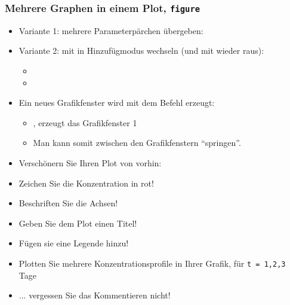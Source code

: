       \begin{frame}
          \frametitle{Mehrere Graphen in einem Plot, \texttt{figure}}
          \begin{itemize}
              \item Variante 1: mehrere Parameterpärchen übergeben: 
              \item Variante 2: mit  in Hinzufügmodus wechseln (und mit  wieder raus):
              \begin{itemize}
                  \item {}
                  \item {}
              \end{itemize}
              \item Ein neues Grafikfenster wird mit dem Befehl  erzeugt:
              \begin{itemize}
                  \item {}, erzeugt das Grafikfenster 1
                  \item Man kann somit zwischen den Grafikfenstern ``springen''.
              \end{itemize}
          \end{itemize}
      \end{frame}


      \secMexercise
      \begin{frame}
          \frameMexercise
          \begin{exercise}
              \sloppy
              \begin{itemize}
                  \item Verschönern Sie Ihren Plot von vorhin:
                  \item Zeichen Sie die Konzentration in rot!
                  \item Beschriften Sie die Achsen!
                  \item Geben Sie dem Plot einen Titel!
                  \item Fügen sie eine Legende hinzu!
                  \item Plotten Sie mehrere Konzentrationsprofile in Ihrer Grafik, für \texttt{t = 1,2,3} Tage
                  \item ... vergessen Sie das \alert{Kommentieren} nicht!
              \end{itemize}
          \end{exercise}
      \end{frame}


